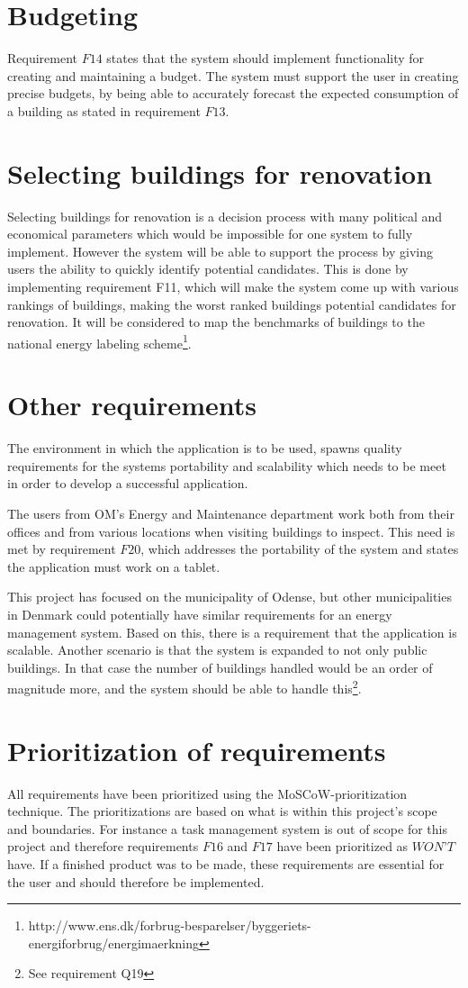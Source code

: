 \section{Budgeting}
Requirement $F14$ states that the system should implement functionality for creating and maintaining a budget. The system must support the user in creating precise budgets, by being able to accurately forecast the expected consumption of a building as stated in requirement $F13$.
\section{Selecting buildings for renovation}
Selecting buildings for renovation is a decision process with many political and economical parameters which would be impossible for one system to fully implement. However the system will be able to support the process by giving users the ability to quickly identify potential candidates. This is done by implementing requirement F11, which will make the system come up with various rankings of buildings, making the worst ranked buildings potential candidates for renovation. It will be considered to map the benchmarks of buildings to the national energy labeling scheme\footnote{ http://www.ens.dk/forbrug-besparelser/byggeriets-energiforbrug/energimaerkning }.
\section{Other requirements}
The environment in which the application is to be used, spawns quality requirements for the systems portability and scalability which needs to be meet in order to develop a successful application. 

The users from OM’s Energy and Maintenance department work both from their offices and from various locations when visiting buildings to inspect. This need is met by requirement $F20$, which addresses the portability of the system and states the application must work on a tablet. 

This project has focused on the municipality of Odense, but other municipalities in Denmark could potentially have similar requirements for an energy management system. Based on this, there is a requirement that the application is scalable. Another scenario is that the system is expanded to not only public buildings. In that case the number of buildings handled would be an order of magnitude more, and the system should be able to handle this\footnote{See requirement Q19}. 
\section{Prioritization of requirements}
All requirements have been prioritized using the MoSCoW-prioritization technique. The prioritizations are based on what is within this project's scope and boundaries. For instance a task management system is out of scope for this project and therefore requirements $F16$ and $F17$ have been prioritized as $WON’T$ have. If a finished product was to be made, these requirements are essential for the user and should therefore be implemented.
